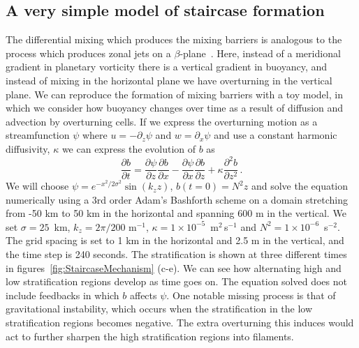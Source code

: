 \subsection{A very simple model of staircase formation}
The differential mixing which produces the mixing barriers is analogous to the process which produces zonal jets on a $\beta$-plane~\cite{Manfroi1999}. Here, instead of a meridional gradient in planetary vorticity there is a vertical gradient in buoyancy, and instead of mixing in the horizontal plane we have overturning in the vertical plane. We can reproduce the formation of mixing barriers with a toy model, in which we consider how buoyancy changes over time as a result of diffusion and advection by overturning cells. If we express the overturning motion as a streamfunction $\psi$ where $u = - \partial_z \psi$ and $w = \partial_x \psi$ and use a constant harmonic diffusivity, $\kappa$ we can express the evolution of $b$ as
\begin{equation}
    \frac{\partial b}{\partial t} = \frac{\partial \psi}{\partial z} \frac{\partial b}{\partial x} - \frac{\partial \psi}{\partial x} \frac{\partial b}{\partial z} + \kappa \frac{\partial^2 b}{\partial z^2} \, .
\end{equation}
We will choose $\psi = e^{- x^2 / 2\sigma^2} \sin(k_z z)$, $b(t=0) = N^2 z$ and solve the equation numerically using a 3rd order Adam's Bashforth scheme on a domain stretching from -50 km to 50 km in the horizontal and spanning 600 m in the vertical. We set $\sigma = 25$~km, $k_z = 2 \pi / 200$ m$^{-1}$, $\kappa = 1 \times 10^{-5}$~m$^2$\,s$^{-1}$ and $N^2 = 1 \times 10^{-6}$~s$^{-2}$. The grid spacing is set to 1 km in the horizontal and 2.5 m in the vertical, and the time step is 240 seconds. The stratification is shown at three different times in figures~\ref{fig:StaircaseMechanism} (c-e). We can see how alternating high and low stratification regions develop as time goes on. The equation solved does not include feedbacks in which $b$ affects $\psi$. One notable missing process is that of gravitational instability, which occurs when the stratification in the low stratification regions becomes negative. The extra overturning this induces would act to further sharpen the high stratification regions into filaments.





